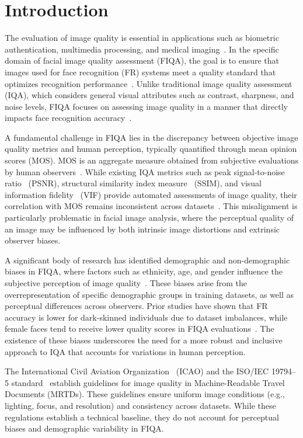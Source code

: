 \section{Introduction}

The evaluation of image quality is essential in applications such as biometric authentication, multimedia processing, and medical imaging~\cite{Kim2015, Huang2020}. In the specific domain of facial image quality assessment (FIQA), the goal is to ensure that images used for face recognition (FR) systems meet a quality standard that optimizes recognition performance~\cite{Cavazos2021}. Unlike traditional image quality assessment (IQA), which considers general visual attributes such as contrast, sharpness, and noise levels, FIQA focuses on assessing image quality in a manner that directly impacts face recognition accuracy~\cite{Terhoerst2020}. 

A fundamental challenge in FIQA lies in the discrepancy between objective image quality metrics and human perception, typically quantified through mean opinion scores (MOS). MOS is an aggregate measure obtained from subjective evaluations by human observers~\cite{ITU-R-BT500}. While existing IQA metrics such as peak signal-to-noise ratio~\cite{gonzalez2002digital} (PSNR), structural similarity index measure~\cite{wang2004image} (SSIM), and visual information fidelity~\cite{sheikh2006image} (VIF) provide automated assessments of image quality, their correlation with MOS remains inconsistent across datasets~\cite{Babnik2022}. This misalignment is particularly problematic in facial image analysis, where the perceptual quality of an image may be influenced by both intrinsic image distortions and extrinsic observer biases. 

A significant body of research has identified demographic and non-demographic biases in FIQA, where factors such as ethnicity, age, and gender influence the subjective perception of image quality~\cite{Kabbani2024, 9304865, Cavazos2021, tapia2024beauty}. These biases arise from the overrepresentation of specific demographic groups in training datasets, as well as perceptual differences across observers. Prior studies have shown that FR accuracy is lower for dark-skinned individuals due to dataset imbalances, while female faces tend to receive lower quality scores in FIQA evaluations~\cite{Huang2020}. The existence of these biases underscores the need for a more robust and inclusive approach to IQA that accounts for variations in human perception.

The International Civil Aviation Organization~\cite{icao_2015} (ICAO) and the ISO/IEC 19794--5 standard~\cite{iso_iec29794-5_2010} establish guidelines for image quality in Machine-Readable Travel Documents (MRTDs). These guidelines ensure uniform image conditions (e.g., lighting, focus, and resolution) and consistency across datasets.
While these regulations establish a technical baseline, they do not account for perceptual biases and demographic variability in FIQA.\@

